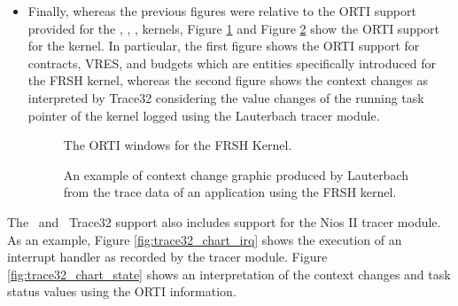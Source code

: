 \begin{itemize}
\item Finally, whereas the previous figures were relative to the ORTI
  support provided for the , , ,
   kernels, Figure \ref{fig:trace32_frsh_orti} and Figure
  \ref{fig:trace32_frsh_task_graph} show the ORTI support for the
   kernel. In particular, the first figure shows the ORTI
  support for contracts, VRES, and budgets which are entities
  specifically introduced for the FRSH kernel, whereas the second
  figure shows the context changes as interpreted by Trace32
  considering the value changes of the running task pointer of the
  kernel logged using the Lauterbach tracer module.
%
\begin{figure}
\caption{\label{fig:trace32_frsh_orti} The ORTI windows for the FRSH Kernel.}
\end{figure}
%
\begin{figure}
\caption{\label{fig:trace32_frsh_task_graph} An example of context change graphic produced by Lauterbach from the trace data of an application using the FRSH kernel.}
\end{figure}

\end{itemize}


The \rtd\ and \ee\ Trace32 support also includes support for the Nios
II tracer module. As an example, Figure \ref{fig:trace32_chart_irq}
shows the execution of an interrupt handler as recorded by the tracer
module. Figure \ref{fig:trace32_chart_state} shows an interpretation
of the context changes and task status values using the ORTI
information.

